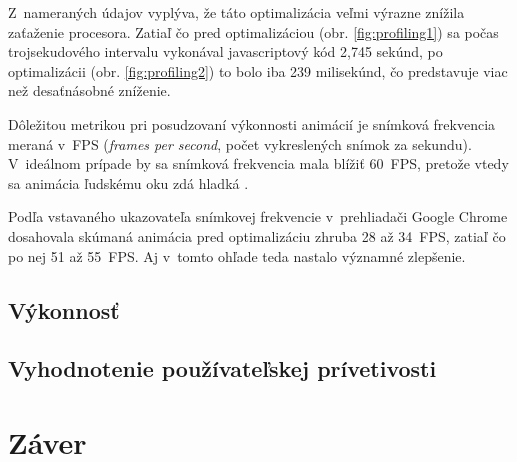 Z~nameraných údajov vyplýva, že táto optimalizácia veľmi výrazne znížila zaťaženie procesora. Zatiaľ čo pred optimalizáciou (obr. \ref{fig:profiling1}) sa počas trojsekudového intervalu vykonával javascriptový kód 2,745 sekúnd, po optimalizácii (obr. \ref{fig:profiling2}) to bolo iba 239 milisekúnd, čo predstavuje viac než desaťnásobné zníženie.

Dôležitou metrikou pri posudzovaní výkonnosti animácií je snímková frekvencia meraná v~FPS (\emph{frames per second}, počet vykreslených snímok za sekundu). V~ideálnom prípade by sa snímková frekvencia mala blížiť 60~FPS, pretože vtedy sa animácia ľudskému oku zdá hladká \cite{chrome_profiling}.

Podľa vstavaného ukazovateľa snímkovej frekvencie v~prehliadači Google Chrome dosahovala skúmaná animácia pred optimalizáciu zhruba 28 až 34~FPS, zatiaľ čo po nej 51 až 55~FPS. Aj v~tomto ohľade teda nastalo významné zlepšenie.


\section{Výkonnosť}

\section{Vyhodnotenie používateľskej prívetivosti}

\chapter{Záver}



%
